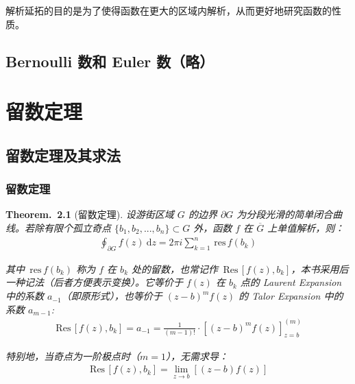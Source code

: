 \documentclass[UTF8]{report}
\def\res{\mathrm{\,res\,}}
\def\Res{\mathrm{\,Res\,}}
\theoremstyle{MyLineTheoremStyle} %
\theoremstyle{MyBlockTheoremStyle} %
\newtheorem{BlockTheorem}[LineTheorem]{Theorem.\,} %
\theoremstyle{MySubsubsectionStyle} %
\begin{document}
解析延拓的目的是为了使得函数在更大的区域内解析，从而更好地研究函数的性质。

\section{Bernoulli 数和 Euler 数（略）}


\chapter{留数定理}\thispagestyle{fancy}

\section{留数定理及其求法}

\subsection{留数定理}

\begin{BlockTheorem}[留数定理]\label{留数定理}
设游街区域 $G$ 的边界 $\partial G$ 为分段光滑的简单闭合曲线。若除有限个孤立奇点 $\{b_1, b_2, ..., b_n\} \subset G$ 外，函数 $f$ 在 $\overline{G}$ 上单值解析，则：
\begin{gather}
\oint_{\partial G} f(z) \ \mathrm{d}z = 2 \pi i \sum_{k = 1}^{n} \res f(b_k)
\end{gather}

其中 $\res f(b_k)$ 称为 $f$ 在 $b_k$ 处的留数，也常记作 $\Res \left[ f(z), b_k \right]$，本书采用后一种记法（后者方便表示变换）。它等价于 $f(z)$ 在 $b_k$ 点的 Laurent Expansion 中的系数 $a_{-1}$（即原形式），也等价于 $(z-b)^mf(z)$ 的 Talor Expansion 中的系数 $a_{m-1}$:
\begin{gather}
\boxed{
    \Res \left[ f(z), b_k \right] = 
    a_{-1} =
    \frac{1}{(m-1)!}\cdot \left[(z-b)^mf(z)\right]^{(m)}_{z=b}
}
\end{gather}

特别地，当奇点为一阶极点时（$m=1$），无需求导：
\begin{gather}
    \Res \left[ f(z), b_k \right] = \lim_{z\to b}\left[(z-b)f(z)\right]
\end{gather}
\end{BlockTheorem}
\end{document}
